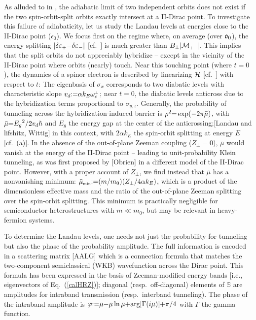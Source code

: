 \documentclass[aps, prb, showpacs, twocolumn, notitlepage, superscriptaddress]{revtex4-1}
\begin{document}
As alluded to in , the adiabatic limit of two independent orbits does not exist if the two spin-orbit-split orbits exactly intersect at a II-Dirac point. To investigate this failure of adiabaticity, let us study the Landau levels at energies close to the II-Dirac point ($\epsilon_0$). We focus first on the regime where, on average (over $\mathfrak{o}_0$), the energy splitting $|\delta \varepsilon_+{-}\delta \varepsilon_-|$ [cf.\ ] is much greater than $B_\perp|{\cal M}_{\scriptscriptstyle{+-}}|$. This implies that the split orbits do not appreciably hybridize -- except in the vicinity of the II-Dirac point where orbits (nearly) touch.  Near this touching point (where $t{=}0$), the dynamics of a spinor electron is described by linearizing $\mathcal{H}$ [cf.\ ] with respect to $t$:
The eigenbasis of $\sigma_x$ corresponds to two diabatic levels with characteristic slope $v_d{:}{=}\alpha k_E\omega^{\scriptscriptstyle{\perp}}_c$; near $t{=}0$, the diabatic levels anticross  due to the hybridization terms proportional to $\sigma_{y,z}$. Generally, the probability of tunneling across the hybridization-induced barrier is  $\rho^2{=}\exp(-2\pi\bar{\mu})$, with $\bar{\mu}{=}{E_g}^2/{2v_d \hbar}$ and $E_g$ the energy gap at the center of the anticrossing;[Landau and lifshitz, Wittig] in this context,
with $2\alpha k_E$ the spin-orbit splitting at energy $E$ [cf.\ (a)]. In the absence of the out-of-plane Zeeman coupling ($Z_\perp{=}0$), $\bar{\mu}$ would vanish at the energy of the II-Dirac point -- leading to unit-probability Klein tunneling, as was first proposed by [Obrien] in a different model of the II-Dirac point. However, with a proper account of $Z_\perp$, we find instead that $\bar{\mu}$ has a nonvanishing minimum: $\bar{\mu}_{\scriptscriptstyle{\text{min}}}{:}{=} ( m/m_0)(Z_\perp/4\alpha k_{E})$, which is a product of the dimensionless effective mass and the ratio of the out-of-plane Zeeman splitting over the spin-orbit splitting. This minimum is practically negligible for  semiconductor heterostructures with $m{\ll}m_0$, but may be relevant in heavy-fermion systems. 


To determine the Landau levels, one needs not just the probability for tunneling but also the phase of the probability amplitude. The full information is encoded in a scattering matrix [AALG]
which is a connection formula that matches the two-component semiclassical (WKB) wavefunction across the Dirac point. This formula  has been expressed in the basis of Zeeman-modified energy bands [i.e., eigenvectors of Eq.\ (\ref{calHRZ})]; diagonal (resp.\ off-diagonal) elements of $\mathbb{S}$ are amplitudes for intraband transmission (resp.\ interband tunneling). The phase of the intraband amplitude is $\bar{\varphi}{:}{=}\bar{\mu}{-}\bar{\mu}\ln\bar{\mu}{+}\text{arg}[\Gamma(i\bar{\mu})]{+}\pi/4$ with $\Gamma$ the gamma function.
\end{document}
